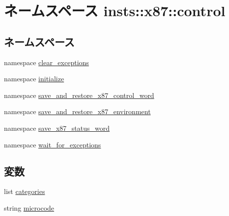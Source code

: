 \hypertarget{namespaceinsts_1_1x87_1_1control}{
\section{ネームスペース insts::x87::control}
\label{namespaceinsts_1_1x87_1_1control}
}
\subsection*{ネームスペース}
\begin{DoxyCompactItemize}
\item 
namespace \hyperlink{namespaceinsts_1_1x87_1_1control_1_1clear__exceptions}{clear\_\-exceptions}
\item 
namespace \hyperlink{namespaceinsts_1_1x87_1_1control_1_1initialize}{initialize}
\item 
namespace \hyperlink{namespaceinsts_1_1x87_1_1control_1_1save__and__restore__x87__control__word}{save\_\-and\_\-restore\_\-x87\_\-control\_\-word}
\item 
namespace \hyperlink{namespaceinsts_1_1x87_1_1control_1_1save__and__restore__x87__environment}{save\_\-and\_\-restore\_\-x87\_\-environment}
\item 
namespace \hyperlink{namespaceinsts_1_1x87_1_1control_1_1save__x87__status__word}{save\_\-x87\_\-status\_\-word}
\item 
namespace \hyperlink{namespaceinsts_1_1x87_1_1control_1_1wait__for__exceptions}{wait\_\-for\_\-exceptions}
\end{DoxyCompactItemize}
\subsection*{変数}
\begin{DoxyCompactItemize}
\item 
list \hyperlink{namespaceinsts_1_1x87_1_1control_a273cf0f1630af14c1582f05e53354a55}{categories}
\item 
string \hyperlink{namespaceinsts_1_1x87_1_1control_a770f11a173e99389a8802f0107ed8f52}{microcode}
\end{DoxyCompactItemize}


